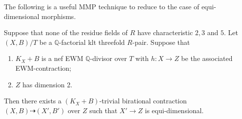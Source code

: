 The following is a useful MMP technique to reduce to the case of equi-dimensional morphisms.

\begin{proposition}\label{three}
	Suppose that none of the residue fields of $R$ have characteristic $2,3$ and $5$. 
	Let $(X,B)/T$ be a $\mathbb{Q}$-factorial klt threefold $R$-pair.
	Suppose that
	\begin{enumerate}
		\item $K_X+B$ is a nef EWM $\mathbb{Q}$-divisor over $T$ with  $h \colon X \to Z$ be the associated EWM-contraction;
		\item $Z$ has dimension 2.
	\end{enumerate}
	Then there exists a $(K_X+B)$-trivial birational contraction $(X,B) \dashrightarrow (X', B')$ over $Z$ such that $X' \to Z$ is equi-dimensional. 
\end{proposition}


